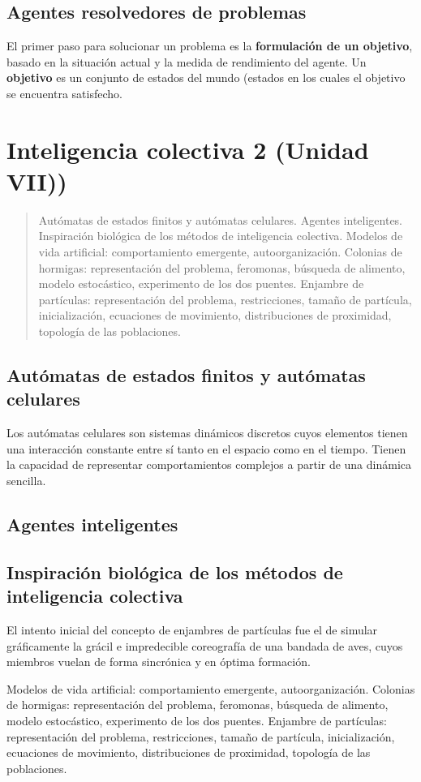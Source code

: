 \documentclass[10pt,a4paper]{article}
\begin{document}
\subsection{Agentes resolvedores de problemas}

El primer paso para solucionar un problema es la \textbf{formulación de un objetivo}, basado en la situación actual y la medida de rendimiento del agente. Un \textbf{objetivo} es un conjunto de estados del mundo (estados en los cuales el objetivo se encuentra satisfecho.


\pagebreak
\section{Inteligencia colectiva 2 (Unidad VII))}
\begin{quote}
Autómatas de estados finitos y autómatas celulares. Agentes inteligentes. Inspiración biológica de los métodos de inteligencia colectiva. Modelos de vida artificial: comportamiento emergente, autoorganización. Colonias de hormigas: representación del problema, feromonas, búsqueda de alimento, modelo estocástico, experimento de los dos puentes. Enjambre de partículas: representación del problema, restricciones, tamaño de partícula, inicialización, ecuaciones de movimiento, distribuciones de proximidad, topología de las poblaciones.
\end{quote}

\subsection{Autómatas de estados finitos y autómatas celulares}

Los autómatas celulares son sistemas dinámicos discretos cuyos elementos tienen una interacción constante entre sí tanto en el espacio como en el tiempo.  Tienen la capacidad de representar comportamientos complejos a partir de una dinámica sencilla. 

\subsection{Agentes inteligentes}

\subsection{Inspiración biológica de los métodos de inteligencia colectiva}
El intento inicial del concepto de enjambres de partículas fue el de simular gráficamente la grácil e impredecible coreografía de una bandada de aves, cuyos miembros vuelan de forma sincrónica y en óptima formación.



Modelos de vida artificial: comportamiento emergente, autoorganización. Colonias de hormigas: representación del problema, feromonas, búsqueda de alimento, modelo estocástico, experimento de los dos puentes. Enjambre de partículas: representación del problema, restricciones, tamaño de partícula, inicialización, ecuaciones de movimiento, distribuciones de proximidad, topología de las poblaciones.
\end{document}
